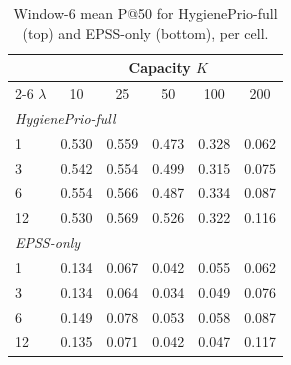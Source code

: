\begin{table}[!t]
 \caption{Window-6 mean P@50 for HygienePrio-full (top) and EPSS-only (bottom), per cell.}
 \label{tab:w6}
 \centering
 \small
 \setlength{\tabcolsep}{4pt}
 \begin{tabular}{lccccc}
 \toprule
 & \multicolumn{5}{c}{Capacity $K$} \\
 \cmidrule(lr){2-6}
 $\lambda$ & 10 & 25 & 50 & 100 & 200 \\
 \midrule
 \multicolumn{6}{l}{\textit{HygienePrio-full}} \\
 1 & 0.530 & 0.559 & 0.473 & 0.328 & 0.062 \\
 3 & 0.542 & 0.554 & 0.499 & 0.315 & 0.075 \\
 6 & 0.554 & 0.566 & 0.487 & 0.334 & 0.087 \\
 12 & 0.530 & 0.569 & 0.526 & 0.322 & 0.116 \\
 \midrule
 \multicolumn{6}{l}{\textit{EPSS-only}} \\
 1 & 0.134 & 0.067 & 0.042 & 0.055 & 0.062 \\
 3 & 0.134 & 0.064 & 0.034 & 0.049 & 0.076 \\
 6 & 0.149 & 0.078 & 0.053 & 0.058 & 0.087 \\
 12 & 0.135 & 0.071 & 0.042 & 0.047 & 0.117 \\
 \bottomrule
 \end{tabular}
\end{table}
